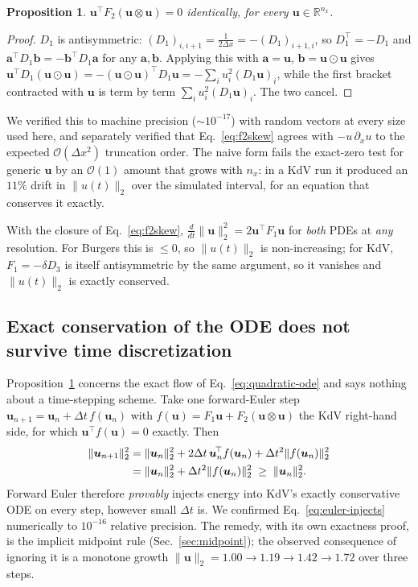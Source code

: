 \documentclass[aps,prx,twocolumn,notitlepage,superscriptaddress,floatfix,10pt]{revtex4-2}
\newtheorem{proposition}{Proposition}
\newcommand{\norm}[1]{\lVert #1 \rVert}
\newcommand{\R}{\mathbb{R}}
\newcommand{\Oh}{\mathcal{O}}
\begin{document}
\begin{proposition}
\label{prop:closure}
$\bm u^{\!\top}F_2(\bm u\otimes\bm u)=0$ identically, for every $\bm u\in\R^{n_x}$.
\end{proposition}
\begin{proof}
$D_1$ is antisymmetric: $(D_1)_{i,i+1}=\tfrac{1}{2\Delta x}=-(D_1)_{i+1,i}$, so $D_1^{\!\top}=-D_1$
and $\bm a^{\!\top}D_1\bm b=-\bm b^{\!\top}D_1\bm a$ for any $\bm a,\bm b$. Applying this with
$\bm a=\bm u$, $\bm b=\bm u\odot\bm u$ gives
$\bm u^{\!\top}D_1(\bm u\odot\bm u)=-(\bm u\odot\bm u)^{\!\top}D_1\bm u=-\sum_iu_i^2(D_1\bm u)_i$,
while the first bracket contracted with $\bm u$ is term by term $\sum_iu_i^2(D_1\bm u)_i$. The two
cancel.
\end{proof}

We verified this to machine precision ($\sim10^{-17}$) with random vectors at every size used here,
and separately verified that Eq.~\eqref{eq:f2skew} agrees with $-u\,\partial_xu$ to the expected
$\Oh(\Delta x^2)$ truncation order. The naive form fails the exact-zero test for generic $\bm u$ by an
$\Oh(1)$ amount that grows with $n_x$: in a KdV run it produced an $11\%$ drift in $\norm{u(t)}_2$
over the simulated interval, for an equation that conserves it exactly.

With the closure of Eq.~\eqref{eq:f2skew}, $\tfrac{d}{dt}\norm{\bm u}_2^2=2\bm u^{\!\top}F_1\bm u$ for
\emph{both} PDEs at \emph{any} resolution. For Burgers this is $\le0$, so $\norm{u(t)}_2$ is
non-increasing; for KdV, $F_1=-\delta D_3$ is itself antisymmetric by the same argument, so it
vanishes and $\norm{u(t)}_2$ is exactly conserved.

\subsection{Exact conservation of the ODE does not survive time discretization}
\label{sec:euler}

Proposition~\ref{prop:closure} concerns the exact flow of Eq.~\eqref{eq:quadratic-ode} and says
nothing about a time-stepping scheme. Take one forward-Euler step
$\bm u_{n+1}=\bm u_n+\Delta t\,f(\bm u_n)$ with $f(\bm u)=F_1\bm u+F_2(\bm u\otimes\bm u)$ the KdV
right-hand side, for which $\bm u^{\!\top}f(\bm u)=0$ exactly. Then
\begin{align}
\norm{\bm u_{n+1}}_2^2
&=\norm{\bm u_n}_2^2+2\Delta t\,\bm u_n^{\!\top}f(\bm u_n)+\Delta t^2\norm{f(\bm u_n)}_2^2\notag\\
&=\norm{\bm u_n}_2^2+\Delta t^2\norm{f(\bm u_n)}_2^2\;\ge\;\norm{\bm u_n}_2^2 .
\label{eq:euler-injects}
\end{align}
Forward Euler therefore \emph{provably} injects energy into KdV's exactly conservative ODE on every
step, however small $\Delta t$ is. We confirmed Eq.~\eqref{eq:euler-injects} numerically to $10^{-16}$
relative precision. The remedy, with its own exactness proof, is the implicit midpoint rule
(Sec.~\ref{sec:midpoint}); the observed consequence of ignoring it is a monotone growth
$\norm{\bm u}_2 = 1.00\to1.19\to1.42\to1.72$ over three steps.
\end{document}
